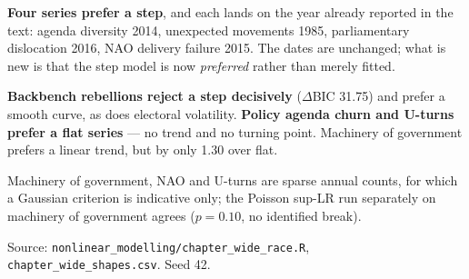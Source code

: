 \begin{table}[htbp]
\begin{threeparttable}
\begin{tablenotes}
\item \textbf{Four series prefer a step}, and each lands on the year already reported in the text: agenda diversity 2014, unexpected movements 1985, parliamentary dislocation 2016, NAO delivery failure 2015. The dates are unchanged; what is new is that the step model is now \emph{preferred} rather than merely fitted.
\item \textbf{Backbench rebellions reject a step decisively} ($\Delta$BIC 31.75) and prefer a smooth curve, as does electoral volatility. \textbf{Policy agenda churn and U-turns prefer a flat series} --- no trend and no turning point. Machinery of government prefers a linear trend, but by only 1.30 over flat.
\item Machinery of government, NAO and U-turns are sparse annual counts, for which a Gaussian criterion is indicative only; the Poisson sup-LR run separately on machinery of government agrees ($p=0.10$, no identified break).
\item Source: \texttt{nonlinear\_modelling/chapter\_wide\_race.R}, \texttt{chapter\_wide\_shapes.csv}. Seed 42.
\end{tablenotes}
\end{threeparttable}
\end{table}
